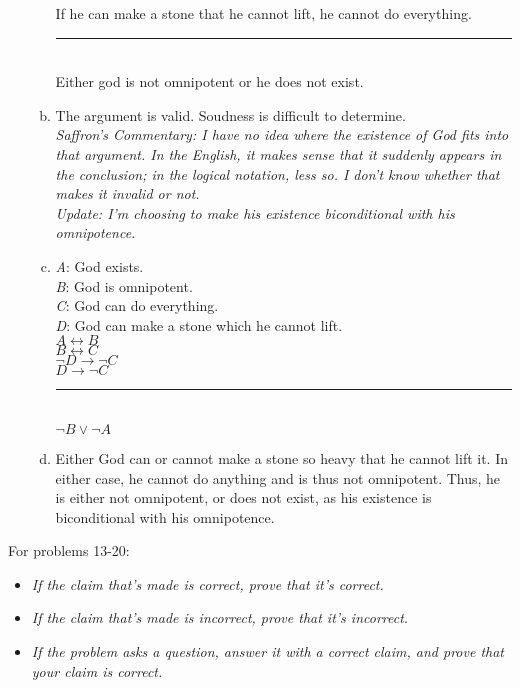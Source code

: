 \documentclass{article}
\begin{document}
\begin{enumerate}
\begin{enumerate}[(a)]
                        If he can make a stone that he cannot lift, he cannot do everything.\\
                        \rule{15em}{.5pt}\\
                        Either god is not omnipotent or he does not exist.
                  \item The argument is valid. Soudness is difficult to determine.\\
                        \textit{Saffron's Commentary: I have no idea where the existence of God fits into that argument. In the English, it makes sense that it suddenly appears in the conclusion; in the logical notation, less so. I don't know whether that makes it invalid or not.\\
                              Update: I'm choosing to make his existence biconditional with his omnipotence.}
                  \item \textit{A}: God exists.\\
                        \textit{B}: God is omnipotent.\\
                        \textit{C}: God can do everything.\\
                        \textit{D}: God can make a stone which he cannot lift.\\

                        $A \leftrightarrow B$\\
                        $B \leftrightarrow C$\\
                        $\neg D \to \neg C$\\
                        $D \to \neg C$\\
                        \rule{5em}{.5pt}\\
                        $\neg B \lor \neg A$
                  \setcounter{enumii}{4}
                  \item Either God can or cannot make a stone so heavy that he cannot lift it. In either case, he cannot do anything and is thus not omnipotent. Thus, he is either not omnipotent, or does not exist, as his existence is biconditional with his omnipotence.
            \end{enumerate}
\end{enumerate}

\begin{flushleft}
      For problems 13-20:
\end{flushleft}

\begin{itemize}
      \item \textit{If the claim that's made is correct, prove that it's correct.}
      \item \textit{If the claim that's made is incorrect, prove that it's incorrect.}
      \item \textit{If the problem asks a question, answer it with a correct claim, and prove that your
                  claim is correct.}
\end{itemize}
\end{document}
